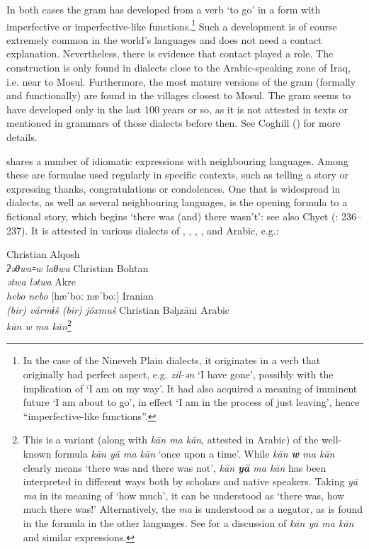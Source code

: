 \documentclass[output=paper]{langsci/langscibook}
\begin{document}
In both cases the gram has developed from a verb ‘to go’ in a form with imperfective or imperfective-like functions.\footnote{In the case of the Nineveh Plain dialects, it originates in a verb that originally had perfect aspect, e.g. \textit{zil-ən} ‘I have gone’, possibly with the implication of ‘I am on my way’. It had also acquired a meaning of imminent {future} ‘I am about to go’, in effect ‘I am in the process of just leaving’, hence ``imperfective-like functions''.} Such a development is of course extremely common in the world’s languages and does not need a contact explanation. Nevertheless, there is evidence that contact played a role. The construction is only found in  dialects close to the Arabic-speaking zone of Iraq, i.e. near to Mosul. Furthermore, the most mature versions of the gram (formally and functionally) are found in the villages closest to Mosul. The gram seems to have developed only in the last 100 years or so, as it is not attested in texts or mentioned in grammars of those dialects before then. See Coghill (\citeyear{Coghill2010,Coghill2012}) for more details.

 shares a number of {idiomatic} expressions with neighbouring languages. Among these are formulae used regularly in specific contexts, such as telling a story or expressing thanks, congratulations or condolences. One that is widespread in  dialects, as well as several neighbouring languages, is the opening formula to a fictional story, which begins ‘there was (and) there wasn’t’: see also Chyet (\citeyear{Chyet1995}: 236–237). It is attested in various dialects of , , , ,  and Arabic, e.g.:

\ea
\ea Christian Alqosh  \citep[268]{Coghill2009} \\  \textit{ʔəθwa꞊w laθwa} 
\ex Christian Bohtan  \citep{Fox2009} \\  \textit{ətwa lətwa} 
\ex Akre   \citep[288]{MacKenzie1962}\\ \textit{hebo nebo} [hæˈboː næˈboː] 
\ex Iranian  \citep[175]{Garbell1965}\\  \textit{(bir) vármɨš (bir) jóxmuš} 
\ex Christian Bəḥzāni Arabic \citep[404]{Jastrow1981}\\\textit{kān w ma kān}\footnote{This is a variant (along with \textit{kān ma kān}, attested in  Arabic) of the well-known formula \textit{kān yā ma kān} ‘once upon a time’. While \textit{kān \textbf{w} ma kān} clearly means ‘there was and there was not’, \textit{kān \textbf{yā} ma kān} has been interpreted in different ways both by scholars and native speakers. Taking \textit{yā ma} in its meaning of ‘how much’, it can be understood as ‘there was, how much there was!’ Alternatively, the \textit{ma} is understood as a negator, as is found in the formula in the other languages. See \citet{Lentin1995} for a discussion of \textit{kān yā ma kān} and similar expressions.}
\z
\z
\end{document}

